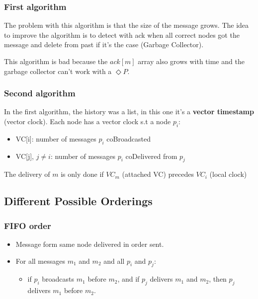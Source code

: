 

\subsubsection{First algorithm}
The problem with this algorithm is that the size of the message
grows. The idea to improve the algorithm is to detect with
ack when all correct nodes got the message and delete from
past if it's the case (Garbage Collector). \newline

This algorithm is bad because the $ack[m]$ array also grows with time and the
garbage collector can't work with a $\Diamond P$.




\subsubsection{Second algorithm}
In the first algorithm, the history was a list, in this one it's a
\textbf{vector timestamp} (vector clock). \newline
Each node has a vector clock s.t a node $p_i$:
\begin{itemize}
    \item VC[i]: number of messages $p_i$ coBroadcasted
    \item VC[j], $j \neq i$: number of messages $p_i$ coDelivered from $p_j$
\end{itemize}
The delivery of $m$ is only done if $VC_m$ (attached VC) precedes $VC_i$
(local clock)



\subsection{Different Possible Orderings}
\subsubsection{FIFO order}
\begin{itemize}
    \item Message form same node delivered in order sent.
    \item For all messages $m_1$ and $m_2$ and all $p_i$ and $p_j$:
        \begin{itemize}
            \item if $p_i$ broadcasts $m_1$ before $m_2$, and
                if $p_j$ delivers $m_1$ and $m_2$, then $p_j$ delivers
                $m_1$ before $m_2$.
        \end{itemize}
\end{itemize}

